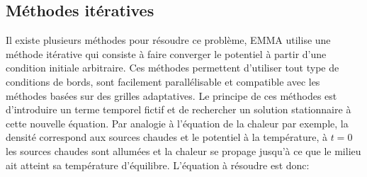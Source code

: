 %
%

\subsection{Méthodes itératives}


Il existe plusieurs méthodes pour résoudre ce problème, EMMA utilise une méthode itérative qui consiste à faire converger le potentiel à partir d'une condition initiale arbitraire. 
Ces méthodes permettent d'utiliser tout type de conditions de bords, sont facilement parallélisable et compatible avec les méthodes basées sur des grilles adaptatives.
Le principe de ces méthodes est d'introduire un terme temporel fictif et de rechercher un solution stationnaire à cette nouvelle équation.
Par analogie à l'équation de la chaleur par exemple, la densité correspond aux sources chaudes et le potentiel à la température, à $t=0$ les sources chaudes sont allumées et la chaleur se propage jusqu'à ce que le milieu ait atteint sa température d'équilibre. 
L'équation à résoudre est donc:

